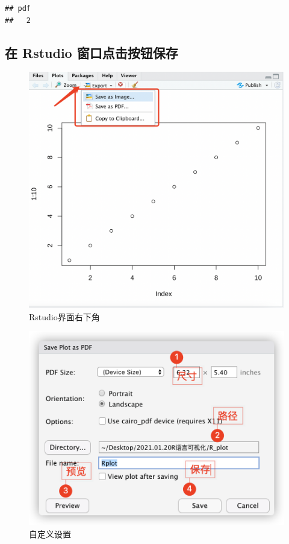 \documentclass[
]{book}
\begin{document}
\begin{verbatim}
## pdf 
##   2
\end{verbatim}

\hypertarget{ux5728-rstudio-ux7a97ux53e3ux70b9ux51fbux6309ux94aeux4fddux5b58}{%
\subsection{在 Rstudio 窗口点击按钮保存}\label{ux5728-rstudio-ux7a97ux53e3ux70b9ux51fbux6309ux94aeux4fddux5b58}}

\begin{figure}
\centering
\includegraphics{figure/12.png}
\caption{Rstudio界面右下角}
\end{figure}

\begin{figure}
\centering
\includegraphics{figure/13.png}
\caption{自定义设置}
\end{figure}
\end{document}
